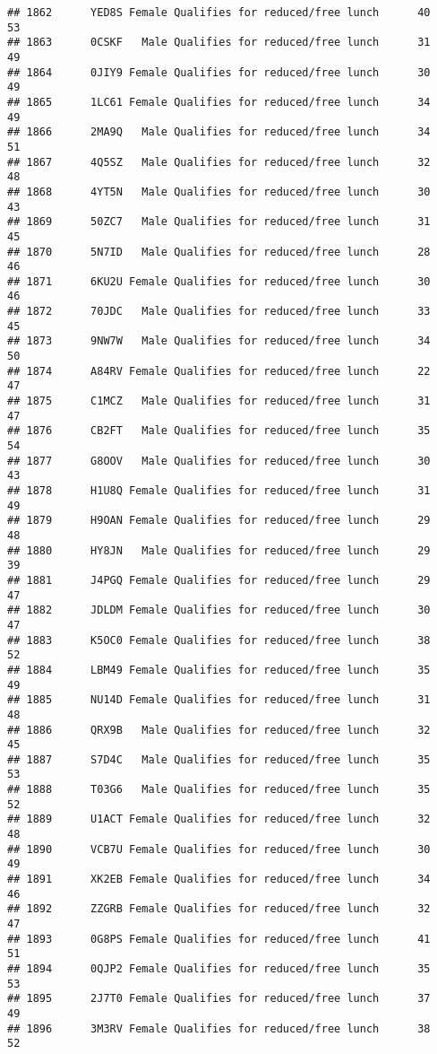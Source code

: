 \documentclass[
]{article}
\begin{document}
\begin{verbatim}
## 1862      YED8S Female Qualifies for reduced/free lunch      40       53
## 1863      0CSKF   Male Qualifies for reduced/free lunch      31       49
## 1864      0JIY9 Female Qualifies for reduced/free lunch      30       49
## 1865      1LC61 Female Qualifies for reduced/free lunch      34       49
## 1866      2MA9Q   Male Qualifies for reduced/free lunch      34       51
## 1867      4Q5SZ   Male Qualifies for reduced/free lunch      32       48
## 1868      4YT5N   Male Qualifies for reduced/free lunch      30       43
## 1869      50ZC7   Male Qualifies for reduced/free lunch      31       45
## 1870      5N7ID   Male Qualifies for reduced/free lunch      28       46
## 1871      6KU2U Female Qualifies for reduced/free lunch      30       46
## 1872      70JDC   Male Qualifies for reduced/free lunch      33       45
## 1873      9NW7W   Male Qualifies for reduced/free lunch      34       50
## 1874      A84RV Female Qualifies for reduced/free lunch      22       47
## 1875      C1MCZ   Male Qualifies for reduced/free lunch      31       47
## 1876      CB2FT   Male Qualifies for reduced/free lunch      35       54
## 1877      G8OOV   Male Qualifies for reduced/free lunch      30       43
## 1878      H1U8Q Female Qualifies for reduced/free lunch      31       49
## 1879      H9OAN Female Qualifies for reduced/free lunch      29       48
## 1880      HY8JN   Male Qualifies for reduced/free lunch      29       39
## 1881      J4PGQ Female Qualifies for reduced/free lunch      29       47
## 1882      JDLDM Female Qualifies for reduced/free lunch      30       47
## 1883      K5OC0 Female Qualifies for reduced/free lunch      38       52
## 1884      LBM49 Female Qualifies for reduced/free lunch      35       49
## 1885      NU14D Female Qualifies for reduced/free lunch      31       48
## 1886      QRX9B   Male Qualifies for reduced/free lunch      32       45
## 1887      S7D4C   Male Qualifies for reduced/free lunch      35       53
## 1888      T03G6   Male Qualifies for reduced/free lunch      35       52
## 1889      U1ACT Female Qualifies for reduced/free lunch      32       48
## 1890      VCB7U Female Qualifies for reduced/free lunch      30       49
## 1891      XK2EB Female Qualifies for reduced/free lunch      34       46
## 1892      ZZGRB Female Qualifies for reduced/free lunch      32       47
## 1893      0G8PS Female Qualifies for reduced/free lunch      41       51
## 1894      0QJP2 Female Qualifies for reduced/free lunch      35       53
## 1895      2J7T0 Female Qualifies for reduced/free lunch      37       49
## 1896      3M3RV Female Qualifies for reduced/free lunch      38       52

\end{verbatim}
\end{document}
